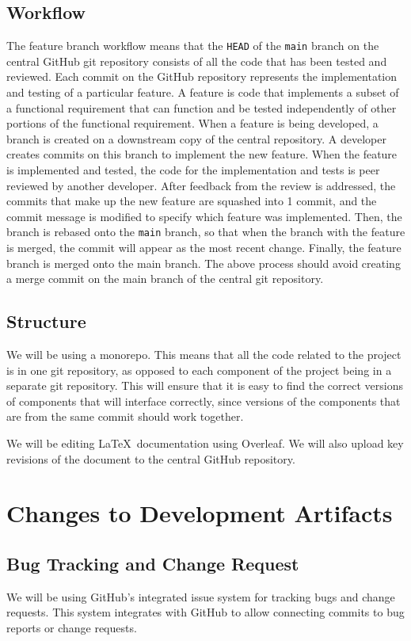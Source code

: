 \documentclass[fullpage]{article}
\begin{document}
\subsection{Workflow}
The feature branch workflow means that the \verb|HEAD| of the \verb|main| branch on the central GitHub git repository consists of all the code that has been tested and reviewed. Each commit on the GitHub repository represents the implementation and testing of a particular feature. A feature is code that implements a subset of a functional requirement that can function and be tested independently of other portions of the functional requirement. When a feature is being developed, a branch is created on a downstream copy of the central repository. A developer creates commits on this branch to implement the new feature. When the feature is implemented and tested, the code for the implementation and tests is peer reviewed by another developer. After feedback from the review is addressed, the commits that make up the new feature are squashed into 1 commit, and the commit message is modified to specify which feature was implemented. Then, the branch is rebased onto the \verb|main| branch, so that when the branch with the feature is merged, the commit will appear as the most recent change. Finally, the feature branch is merged onto the main branch. The above process should avoid creating a merge commit on the main branch of the central git repository. 

\subsection{Structure}
We will be using a monorepo. This means that all the code related to the project is in one git repository, as opposed to each component of the project being in a separate git repository. This will ensure that it is easy to find the correct versions of components that will interface correctly, since versions of the components that are from the same commit should work together. 

We will be editing \LaTeX~documentation using Overleaf. We will also upload key revisions of the document to the central GitHub repository. 


\section{Changes to Development Artifacts}

\subsection{Bug Tracking and Change Request}
We will be using GitHub's integrated issue system for tracking bugs and change requests. This system integrates with GitHub to allow connecting commits to bug reports or change requests.
\end{document}
